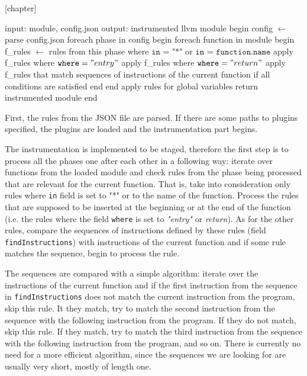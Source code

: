 [chapter] %

\begin{algorithm}[caption={Applying the instrumentation rules.}, label={alg1},columns=fullflexible]
 input: module, config.json
 output: instrumented llvm module
 begin
   config $\gets$ parse config.json
   foreach phase in config
   begin
      foreach function in module
      begin
         f_rules $\gets$ rules from this phase where $\texttt{in = "*"}$ or
                   $\texttt{in = function.name}$
         apply f_rules where $\texttt{where} = "entry"$
         apply f_rules where $\texttt{where} = "return"$
         apply f_rules that match sequences of instructions of the current
         function if all conditions are satisfied
      end
   end
   apply rules for global variables
   return instrumented module
 end
\end{algorithm}

First, the rules from the JSON file are parsed. If there are some paths to
plugins specified, the plugins are loaded and the instrumentation part begins.

The instrumentation is implemented to be staged, therefore the first step is to
process all the phases one after each other in a following way: iterate over
functions from the loaded module and check rules from the phase being processed
that are relevant for the current function. That is, take into consideration
only rules where \texttt{in} field is set to "*" or to the name of the
function. Process the rules that are supposed to be inserted at the beginning
or at the end of the function (i.e. the rules where the field \texttt{where} is
set to \emph{"entry"} or \emph{return}). As for the other rules, compare the
sequences of instructions defined by these rules (field
\texttt{findInstructions}) with instructions of the current function and if
some rule matches the sequence, begin to process the rule.

The sequences are compared with a simple algorithm: iterate over the
instructions of the current function and if the first instruction from the
sequence in \texttt{findInstructions} does not match the current instruction
from the program, skip this rule. It they match, try to match the second
instruction from the sequence with the following instruction from the program.
If they do not match, skip this rule. If they match, try to match the third
instruction from the sequence with the following instruction from the program,
and so on. There is currently no need for a more efficient algorithm, since the
sequences we are looking for are usually very short, mostly of length one.


